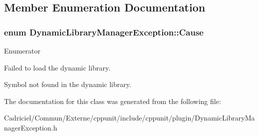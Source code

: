 \subsection{Member Enumeration Documentation}
\hypertarget{class_dynamic_library_manager_exception_a73b4694c152e0693fbc19fb04987a0b9}{
\subsubsection[{Cause}]{\setlength{\rightskip}{0pt plus 5cm}enum {\bf Dynamic\-Library\-Manager\-Exception\-::\-Cause}}}\label{class_dynamic_library_manager_exception_a73b4694c152e0693fbc19fb04987a0b9}
\begin{Desc}
\item[Enumerator]\par
\begin{description}
\item[{\em 
\hypertarget{class_dynamic_library_manager_exception_a73b4694c152e0693fbc19fb04987a0b9a778b42fb996bf018bdc26934649cad63}{loading\-Failed}\label{class_dynamic_library_manager_exception_a73b4694c152e0693fbc19fb04987a0b9a778b42fb996bf018bdc26934649cad63}
}]Failed to load the dynamic library. \item[{\em 
\hypertarget{class_dynamic_library_manager_exception_a73b4694c152e0693fbc19fb04987a0b9a193fc58bb852e09790da269e2b613045}{symbol\-Not\-Found}\label{class_dynamic_library_manager_exception_a73b4694c152e0693fbc19fb04987a0b9a193fc58bb852e09790da269e2b613045}
}]Symbol not found in the dynamic library. \end{description}
\end{Desc}


The documentation for this class was generated from the following file\-:\begin{DoxyCompactItemize}
\item 
Cadriciel/\-Commun/\-Externe/cppunit/include/cppunit/plugin/Dynamic\-Library\-Manager\-Exception.\-h\end{DoxyCompactItemize}
